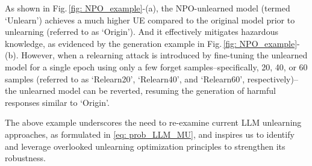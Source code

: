 As shown in {Fig.\,\ref{fig: NPO_example}-(a)}, the NPO-unlearned model  (termed `Unlearn') achieves a much higher UE compared to the original model prior to unlearning (referred to as `Origin'). And it effectively mitigates hazardous knowledge, as evidenced by the generation example in {Fig.\,\ref{fig: NPO_example}-(b)}.
%
However, when a relearning attack is introduced by fine-tuning the unlearned model for a single epoch using only a few forget samples--specifically, 20, 40, or 60 samples (referred to as `Relearn20', `Relearn40', and `Relearn60', respectively)--the unlearned model can be reverted,  resuming the generation of harmful responses similar to `Origin'. %










The above example underscores the need to re-examine current LLM unlearning approaches, as formulated in \eqref{eq: prob_LLM_MU}, and inspires us to identify and leverage overlooked unlearning optimization principles to strengthen its robustness.

